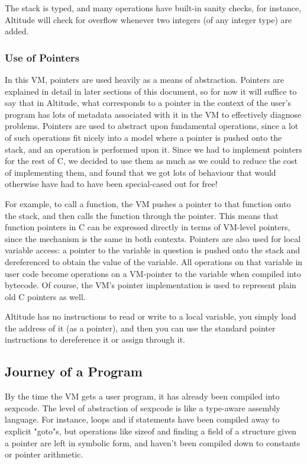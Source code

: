 \documentclass[10pt,a4paper]{report}
\begin{document}
The stack is typed, and many operations have built-in sanity checks, for instance, Altitude will check for overflow whenever two integers (of any integer type) are added.

\subsubsection{Use of Pointers}
In this VM, pointers are used heavily as a means of abstraction. Pointers are explained in detail in later sections of this document, so for now it will suffice to say that in Altitude, what corresponds to a pointer in the context of the user's program has lots of metadata associated with it in the VM to effectively diagnose problems. Pointers are used to abstract upon fundamental operations, since a lot of such operations fit nicely into a model where a pointer is pushed onto the stack, and an operation is performed upon it. Since we had to implement pointers for the rest of C, we decided to use them as much as we could to reduce the cost of implementing them, and found that we got lots of behaviour that would otherwise have had to have been special-cased out for free!

For example, to call a function, the VM pushes a pointer to that function onto the stack, and then calls the function through the pointer. This means that function pointers in C can be expressed directly in terms of VM-level pointers, since the mechanism is the same in both contexts. Pointers are also used for local variable access: a pointer to the variable in question is pushed onto the stack and dereferenced to obtain the value of the variable. All operations on that variable in user code become operations on a VM-pointer to the variable when compiled into bytecode. Of course, the VM's pointer implementation is used to represent plain old C pointers as well.

Altitude has no instructions to read or write to a local variable, you simply load the address of it (as a pointer), and then you can use the standard pointer instructions to dereference it or assign through it.

\subsection{Journey of a Program}

By the time the VM gets a user program, it has already been compiled into sexpcode. The level of abstraction of sexpcode is like a type-aware assembly language. For instance, loops and if statements have been compiled away to explicit "goto"s, but operations like sizeof and finding a field of a structure given a pointer are left in symbolic form, and haven't been compiled down to constants or pointer arithmetic.
\end{document}
